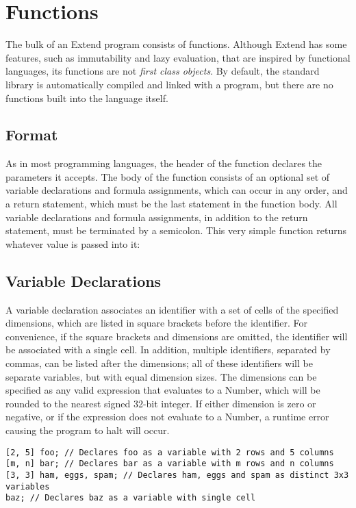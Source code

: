 \section{Functions}
\label{sec:Functions}
The bulk of an Extend program consists of functions. Although Extend has some features, such as immutability and lazy evaluation, that are inspired by functional languages, its functions are not \textit{first class objects}. By default, the standard library is automatically compiled and linked with a program, but there are no functions built into the language itself.
\subsection{Format}
\label{sec:funcdecl}
As in most programming languages, the header of the function declares the parameters it accepts. The body of the function consists of an optional set of variable declarations and formula assignments, which can occur in any order, and a return statement, which must be the last statement in the function body. All variable declarations and formula assignments, in addition to the return statement, must be terminated by a semicolon.
This very simple function returns whatever value is passed into it:

\subsection{Variable Declarations}
\label{sec:vardecl}
A variable declaration associates an identifier with a set of cells of the specified dimensions, which are listed in square brackets before the identifier. For convenience, if the square brackets and dimensions are omitted, the identifier will be associated with a single cell. In addition, multiple identifiers, separated by commas, can be listed after the dimensions; all of these identifiers will be separate variables, but with equal dimension sizes. The dimensions can be specified as any valid expression that evaluates to a Number, which will be rounded to the nearest signed 32-bit integer. If either dimension is zero or negative, or if the expression does not evaluate to a Number, a runtime error causing the program to halt will occur.
\begin{lstlisting}
[2, 5] foo; // Declares foo as a variable with 2 rows and 5 columns
[m, n] bar; // Declares bar as a variable with m rows and n columns
[3, 3] ham, eggs, spam; // Declares ham, eggs and spam as distinct 3x3 variables
baz; // Declares baz as a variable with single cell
\end{lstlisting}
